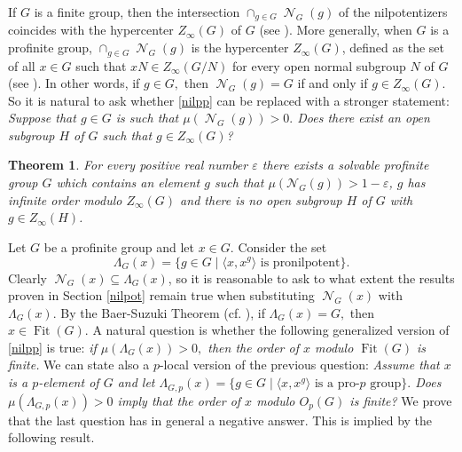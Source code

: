 \documentclass{amsart}
\DeclareMathOperator{\nil}{\mathcal N}
\DeclareMathOperator{\fit}{Fit}
\newtheorem{thm}{Theorem}
\numberwithin{equation}{section}
\begin{document}
If $G$ is a finite group, then the intersection $\cap_{g\in G}\nil_G(g)$ of the nilpotentizers coincides with the hypercenter $Z_\infty(G)$ of $G$ (see \cite[Proposition 2.1]{az}). More generally, when $G$ is a profinite group, $\cap_{g\in G}\nil_G(g)$ is the hypercenter $Z_\infty(G)$, defined as the set of all $x \in G$ such that $xN \in Z_\infty(G/N)$ for every open normal subgroup $N$ of $G$ (see \cite{hyper}). In other words, if $g\in G,$
then $\nil_G(g)=G$ if and only if $g\in Z_\infty(G).$
So it is natural to ask whether \cref{nilpp} can be replaced with a stronger statement: {\sl{Suppose that $g\in G$ is such that $\mu(\nil_G(g))>0.$ Does there exist an open subgroup $H$ of $G$ such that $g\in Z_\infty(G)$?}}

\begin{thm}\label{nofiniteorder}
For every positive real number $\varepsilon$ there exists a solvable profinite group $G$ which contains an element $g$ such that {$\mu(\mathcal{N}_G(g)) > 1-\varepsilon$, $g$ has infinite order modulo $Z_{\infty}(G)$ and} there is no open subgroup $H$ of $G$ with $g \in Z_{\infty}(H)$.
\end{thm}

Let $G$ be a profinite group and let $x\in G.$ Consider the set $$\Lambda_G(x)=\{g\in G \mid \langle x, x^g\rangle \text { is pronilpotent}\}.$$ Clearly $\nil_G(x)\subseteq \Lambda_G(x)$, so it is reasonable to ask to what extent the results proven in  Section \ref{nilpot} remain true when substituting $\nil_G(x)$ with $\Lambda_G(x).$ By the Baer-Suzuki  Theorem (cf. \cite[p. 105]{gor}), if $\Lambda_G(x)=G,$ then $x \in \fit(G).$ A natural question is whether the following generalized version of \cref{nilpp} is true: {\sl{if $\mu(\Lambda_G(x))>0,$ then the order of $x$ modulo $\fit(G)$ is finite}.} 
We can state also a $p$-local version of the previous question: {\sl{Assume that $x$ is a $p$-element of $G$ and let $\Lambda_{G,p}(x)=\{g\in G \mid \langle x, x^g\rangle \text { is a pro-$p$ group}\}.$ Does $\mu(\Lambda_{G,p}(x))>0$ imply that the order of $x$ modulo $O_p(G)$ is finite?}}
We prove that the last question has in general a negative answer. This is implied by the following result.
\end{document}
